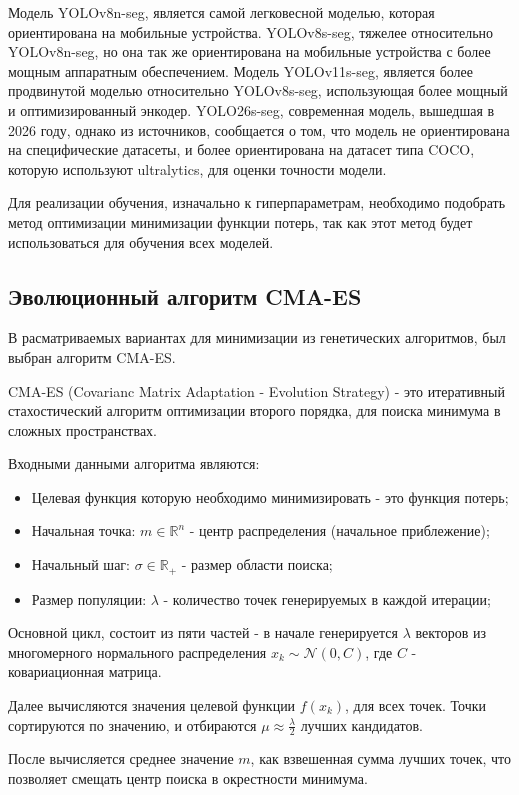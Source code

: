 \documentclass[areasetadvanced]{scrartcl}
\begin{document}
Модель YOLOv8n-seg, является самой легковесной моделью, которая ориентирована на мобильные устройства. 
YOLOv8s-seg, тяжелее относительно YOLOv8n-seg, но она так же ориентирована на мобильные устройства с более мощным аппаратным обеспечением.
Модель YOLOv11s-seg, является более продвинутой моделью относительно YOLOv8s-seg, использующая более мощный и оптимизированный энкодер.
YOLO26s-seg, современная модель, вышедшая в 2026 году, однако из источников, сообщается о том, что модель не ориентирована на специфические датасеты, и более
ориентирована на датасет типа COCO, которую используют ultralytics, для оценки точности модели.

Для реализации обучения, изначально к гиперпараметрам, необходимо подобрать метод оптимизации минимизации функции потерь, так как этот метод будет использоваться для обучения всех моделей.

\subsection{Эволюционный алгоритм CMA-ES}
В расматриваемых вариантах для минимизации из генетических алгоритмов, был выбран алгоритм CMA-ES. 

CMA-ES (Covarianc Matrix Adaptation - Evolution Strategy) - это итеративный стахостический алгоритм оптимизации второго порядка, для поиска минимума в сложных пространствах.

Входными данными алгоритма являются:
\begin{itemize}
    \item Целевая функция которую необходимо минимизировать - это функция потерь;
    \item Начальная точка: $m \in \mathbb{R}^n$ - центр распределения (начальное приблежение);
    \item Начальный шаг: $\sigma \in \mathbb{R}_+$ - размер области поиска;
    \item Размер популяции: $\lambda$ - количество точек генерируемых в каждой итерации;
\end{itemize}

Основной цикл, состоит из пяти частей - в начале генерируется $\lambda$ векторов из многомерного нормального распределения $x_k \sim \mathcal{N}(0,C)$, где $C$ - ковариационная матрица.

Далее вычисляются значения целевой функции $f(x_k)$, для всех точек. Точки сортируются по значению, и отбираются $\mu \approx \frac{\lambda}{2}$ лучших кандидатов.

После вычисляется среднее значение $m$, как взвешенная сумма лучших точек, что позволяет смещать центр поиска в окрестности минимума.
\end{document}
